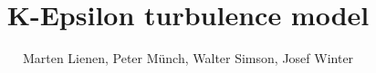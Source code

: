 









\author{Marten Lienen, Peter M\"unch, Walter Simson, Josef Winter}
\title{K-Epsilon turbulence model}


\maketitle
\newpage
\thispagestyle{empty}
\quad
\newpage

\tableofcontents
\printnomenclature
\newpage

\setcounter{alteSeitenzahl}{\value{page}}












\setcounter{page}{\thealteSeitenzahl}
\appendix


\listoffigures
{}

%



